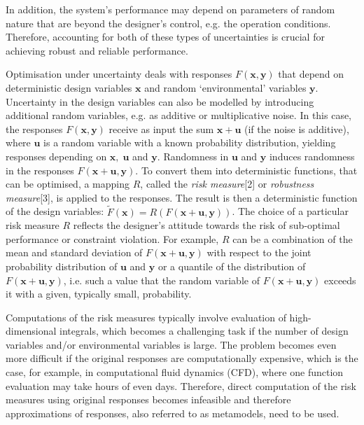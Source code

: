 \documentclass[10pt,twocolumn,a4paper]{article}
\begin{document}
In addition, the system’s performance may depend on parameters of random nature that are beyond the designer’s control, e.g. the operation conditions. Therefore,  accounting for both of these types of uncertainties  is crucial for achieving robust and reliable performance.

Optimisation under uncertainty deals with responses $F(\pmb x,\pmb y)$ that depend on deterministic design variables $\pmb x$ and random ‘environmental’ variables $\pmb y$. Uncertainty in the design variables can also be modelled by introducing additional random variables, e.g. as additive or multiplicative noise. In this case, the responses $F(\pmb x,\pmb y)$ receive as input the sum $\pmb x+\pmb u$ (if the noise is additive), where $\pmb u$ is a random variable with a known probability distribution, yielding responses depending on $\pmb x,\; \pmb u$ and $\pmb y$. Randomness in $\pmb u$ and $\pmb y$ induces randomness in the responses $F(\pmb x+\pmb u,\pmb y)$. To convert them into deterministic functions, that can be optimised, a mapping $R$, called the \textit{risk measure}[2] or \textit{robustness measure}[3], is applied to the responses. The result is then a deterministic function of the design variables: $\widetilde{F}(\pmb x)=R(F(\pmb x+\pmb u, \pmb y))$. The choice of a particular risk measure $R$ reflects the designer's attitude towards the risk of sub-optimal performance or constraint violation. For example, $R$ can be a combination of the mean and standard deviation of $F(\pmb x+ \pmb u,\pmb y)$ with respect to the joint probability distribution of $\pmb u$ and $\pmb y$ or a quantile of the distribution of $F(\pmb x+ \pmb u,\pmb y)$, i.e. such a value that the random variable of $F(\pmb x+\pmb u,\pmb y)$ exceeds it with a given, typically small, probability.

Computations of the risk measures typically involve evaluation of high-dimensional integrals, which becomes a challenging task if the number of design variables and/or environmental variables is large. The problem becomes even more difficult if the original responses are computationally expensive, which is the case, for example, in computational fluid dynamics (CFD), where one function evaluation may take hours of even days. Therefore, direct computation of the risk measures using original responses becomes infeasible and therefore approximations of responses, also referred to as metamodels, need to be used.
\end{document}
